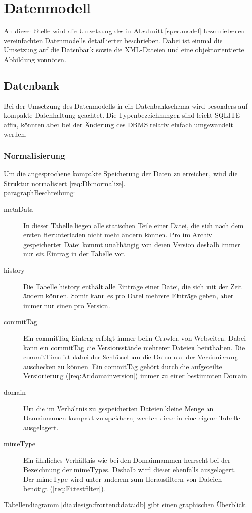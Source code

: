 \chapter{Datenmodell}
\liable{\cii}
An dieser Stelle wird die Umsetzung des in Abschnitt \ref{spec:model} 
beschriebenen vereinfachten Datenmodells detaillierter beschrieben. 
Dabei ist einmal die Umsetzung auf die Datenbank sowie die XML-Dateien und eine objektorientierte
Abbildung vonnöten.

\section{Datenbank}
Bei der Umsetzung des Datenmodells in ein Datenbankschema wird besonders auf kompakte Datenhaltung geachtet. 
Die Typenbezeichnungen sind leicht SQLITE-affin, könnten aber bei der Änderung des DBMS relativ einfach umgewandelt werden.
\subsection{Normalisierung} Um die angesprochene kompakte Speicherung der Daten zu erreichen,
wird die Struktur normalisiert \ref{req:Db:normalize}. \\ 
paragraph{Beschreibung:}
\begin{description}
	\item [metaData]
		In dieser Tabelle liegen alle statischen Teile einer Datei, 
		die sich nach dem ersten Herunterladen nicht mehr ändern können. 
		Pro im Archiv gespeicherter Datei kommt unabhängig von deren Version deshalb 
		immer nur \emph{ein} Eintrag in der Tabelle vor.
	\item [history]
		Die Tabelle history enthält alle Einträge einer Datei, die sich mit der Zeit ändern
		können. Somit kann es pro Datei mehrere Einträge geben, aber immer nur einen pro Version.
	\item [commitTag]
		Ein commitTag-Eintrag erfolgt immer beim Crawlen von Webseiten. Dabei kann ein
		commitTag die Versionsstände mehrerer Dateien beinthalten.
		Die commitTime ist dabei der Schlüssel um die Daten aus der Versionierung
		auschecken zu können.
		Ein commitTag gehört durch die aufgeteilte Versionierung (\ref{req:Ar:domainversion}) immer zu einer bestimmten Domain
	\item [domain]
		Um die im Verhältnis zu gespeicherten Dateien kleine Menge an Domainnamen kompakt zu speichern,
		werden diese in eine eigene Tabelle ausgelagert.
	\item [mimeType]
		Ein ähnliches Verhältnis wie bei den Domainnammen herrscht bei der Bezeichnung der mimeTypes.
		Deshalb wird dieser ebenfalls ausgelagert.
		Der mimeType wird unter anderem zum Herausfiltern von Dateien benötigt (\ref{req:Fi:testfilter}).
\end{description}
Tabellendiagramm \ref{dia:design:frontend:data:db} gibt einen graphischen Überblick.
